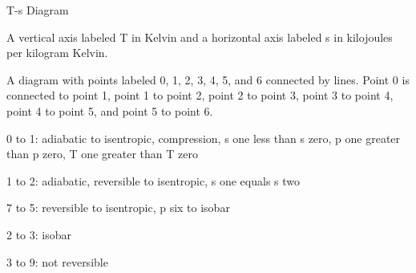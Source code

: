 T-s Diagram

A vertical axis labeled T in Kelvin and a horizontal axis labeled s in kilojoules per kilogram Kelvin. 

A diagram with points labeled 0, 1, 2, 3, 4, 5, and 6 connected by lines. Point 0 is connected to point 1, point 1 to point 2, point 2 to point 3, point 3 to point 4, point 4 to point 5, and point 5 to point 6.

0 to 1: adiabatic to isentropic, compression, s one less than s zero, p one greater than p zero, T one greater than T zero

1 to 2: adiabatic, reversible to isentropic, s one equals s two

7 to 5: reversible to isentropic, p six to isobar

2 to 3: isobar

3 to 9: not reversible